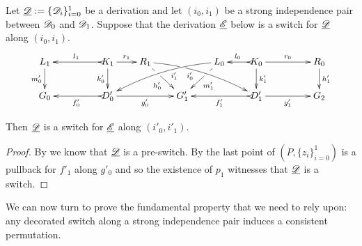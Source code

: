 \begin{corollary}\label{cor:refl}
	Let $\underline{\mathscr{D}}:=\{\mathscr{D}_{i}\}_{i=0}^1$ be a derivation and let $(i_0, i_1)$ be a strong independence pair between $\mathscr{D}_0$ and $\mathscr{D}_1$. Suppose that the derivation $\underline{\mathscr{E}}$ below is a switch for $\underline{\mathscr{D}}$ along $(i_0, i_1)$.	
	\[
	\xymatrix@R=20pt@C=20pt{
		{L_1} \ar[d]_{m_0'}
		&&  {K_1} \ar@{>->}[ll]_{l_1} \ar[r]^{r_1} \ar[d]_{k_0'}
		&  {R_1} \ar[dr]|(.33)\hole_{h_0'}  \ar@/^.25cm/@{>}_(.4){i_0'}|(.32)\hole[drrr]
		& & 
		{L_0}\ar[dl]|(.33)\hole^{m_1'} \ar@/_.25cm/@{>}^(.4){i_1'}[dlll] 
		&  {K_0} \ar@{>->}[l]_{l_0} \ar[rr]^{r_0} \ar[d]^{k_1'}
		& & {R_0} \ar[d]^{h_1'} \\		
		{G_0}
		& & {D_0'} \ar@{>->}[ll]^{f_0'} \ar[rr]_{g_0'}
		& &  {G'_1} 
		& &  {D_1'} \ar@{>->}[ll]^{f_1'} \ar[rr]_{g_1'}
		& & {G_2}  }
	\]

	Then $\underline{\mathscr{D}}$ is a switch for $\underline{\mathscr{E}}$ along $(i'_0, i'_1)$.
\end{corollary}
\begin{proof}
	By  we know that $\underline{\mathscr{D}}$ is a pre-switch. By the last point of  $(P, \{z_i\}_{i=0}^1)$ is a pullback for $f'_1$ along $g'_0$ and so the existence of $p_1$ witnesses that $\underline{\mathscr{D}}$ is a switch.
\end{proof}

We can now turn to prove the fundamental property that we need to rely upon:  any decorated switch along a strong independence pair induces a consistent permutation.

